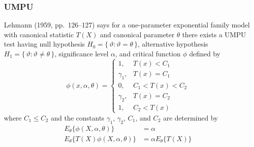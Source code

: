 \documentclass{article}
\newcommand{\set}[1]{\{\, #1 \,\}}
\begin{document}
\subsubsection{UMPU} \label{sec:umpu}

Lehmann (1959, pp.~126--127) says for a one-parameter
exponential family model with canonical statistic $T(X)$ 
and canonical parameter $\theta$
there exists a UMPU test
having null hypothesis $H_0 = \set{ \vartheta : \vartheta = \theta }$,
alternative hypothesis $H_1 = \set{ \vartheta : \vartheta \neq \theta }$,
significance level $\alpha$,
and critical function $\phi$ defined by
\begin{equation} \label{eq:umpu-crit}
   \phi(x, \alpha, \theta)
   =
   \begin{cases}
   1, & T(x) < C_1
   \\
   \gamma_1, & T(x) = C_1
   \\
   0, & C_1 < T(x) < C_2
   \\
   \gamma_2, & T(x) = C_2
   \\
   1, & C_2 < T(x)
   \end{cases}
\end{equation}
where $C_1 \le C_2$ and the constants $\gamma_1$, $\gamma_2$, $C_1$, and $C_2$
are determined by
\begin{subequations}
\begin{align}
   E_\theta\{\phi(X, \alpha, \theta)\} & = \alpha
   \label{eq:umpu-a}
   \\
   E_\theta\{T(X) \phi(X, \alpha, \theta)\} & = \alpha E_\theta\{T(X)\}
   \label{eq:umpu-b}
\end{align}
\end{subequations}
\end{document}
